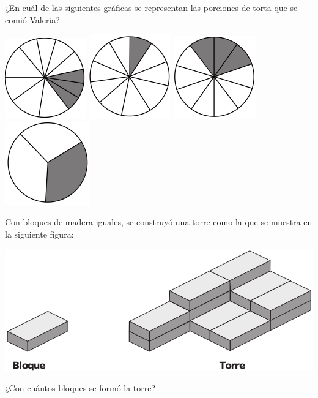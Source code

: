 \documentclass[10pt,addpoints]{exam}
\begin{document}
\begin{multicols}{2}
\begin{questions}
¿En cuál de las siguientes gráficas se representan las porciones de torta que se comió Valeria?
\begin{choices}
\choice \includegraphics[scale=.5]{Images/Pantallazo-24.png} 
\choice \includegraphics[scale=.5]{Images/Pantallazo-25.png} 
\CorrectChoice \includegraphics[scale=.5]{Images/Pantallazo-26.png} 
\choice \includegraphics[scale=.5]{Images/Pantallazo-27.png} 
\end{choices}
\question Con bloques de madera iguales, se construyó una torre como la que se muestra en la siguiente figura:
\begin{center}
\includegraphics[scale=.2]{Images/Pantallazo-15.png} 
\end{center}
¿Con cuántos bloques se formó la torre?


\end{questions}
\end{multicols}
\end{document}
